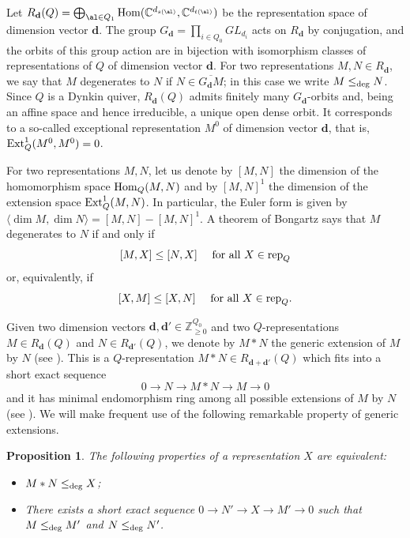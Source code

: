\documentclass{amsart}
\newcommand{\bd}{\mathbf{d}}
\newcommand{\degg}{\le_{\rm deg}}
\numberwithin{equation}{section}
\newtheorem{prop}[thm]{Proposition}
\theoremstyle{remark}
\newcommand{\bC}{{\mathbb C}}
\newcommand{\bZ}{{\mathbb Z}}
\begin{document}
Let $R_\bd(Q)=\bigoplus_{\al\in Q_1} {\rm Hom}(\bC^{d_{s(\al)}},\bC^{d_{t(\al)}})$ be the 
representation space of dimension vector $\bd$.
The group $G_\bd = \prod_{i\in Q_0} GL_{d_i}$ acts on $R_\bd$ by conjugation, and the orbits
of this group action are in bijection with isomorphism classes of representations of $Q$ of dimension vector $\bd$. 
For two representations $M,N\in R_\bd$, we say that $M$ degenerates to $N$ if  $N\in \overline{G_\bd M}$; in this case we write $M\degg N$. Since $Q$ is a Dynkin quiver, 
$R_\bd(Q)$ admits finitely many $G_\bd$-orbits and, being an affine space and hence irreducible, a unique open dense orbit. It corresponds to a so-called exceptional representation $M^0$ of dimension vector $\bd$, that is, ${\rm Ext}^1_Q(M^0,M^0)=0$. 

For two representations $M,N$, let us denote by $[M,N]$ the dimension of the homomorphism space 
${\rm Hom}_Q(M,N)$ and by $[M,N]^1$ the dimension of the extension space 
${\rm Ext}^1_Q(M,N)$. In particular, the Euler form is given by 
$\langle\dim M,\dim N\rangle = [M,N] - [M,N]^1$.
A theorem of Bongartz \cite{Bo96} says that $M$ degenerates to $N$ if and only if 
\[
[M,X]\le [N,X] \quad  \mbox{ for all } X\in {\rm rep}_Q
\]
or, equivalently, if 
\[
[X,M]\le [X,N]\quad \mbox{ for all } X\in {\rm rep}_Q.
\]

Given two dimension vectors $\bd,\bd'\in\bZ_{\ge 0}^{Q_0}$ and two $Q$-representations $M\in R_\bd(Q)$ and $N\in R_{\bd'}(Q)$, we denote by $M\ast N$ the generic extension of $M$ by $N$ (see \cite[Definition~2.2]{Re01}). This is a $Q$-representation $M\ast N\in R_{\bd+\bd'}(Q)$ which fits into  a short exact sequence 
\begin{equation}\label{eq:GenericExtension}
0\to N\to M\ast N\to M\to 0
\end{equation}
and it has minimal endomorphism ring among all possible extensions of $M$ by $N$ (see \cite[Lemma~2.1]{Re01}). We will make frequent use of the following remarkable property of generic extensions. 
\begin{prop}\cite[Prop.~2.4]{Re01}
The following properties of a representation $X$ are equivalent: 
\begin{itemize}
\item $M\ast N\degg X$;
\item There exists a short exact sequence $0\to N'\to X\to M'\to 0$ such that   $M\degg M'$ and $N\degg N'$.
\end{itemize}
\end{prop}
\end{document}
